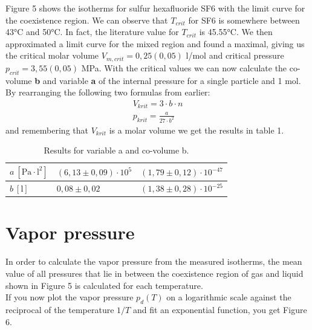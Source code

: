 \documentclass[10pt,a4paper]{article}
\begin{document}
Figure 5 shows the isotherms for sulfur hexafluoride SF6 with the limit curve for the coexistence region. We can observe that $T_{crit}$ for SF6 is somewhere between 43°C and 50°C. In fact, the literature value for $T_{crit}$ is 45.55°C.\cite{messerDataSheet}
We then approximated a limit curve for the mixed region and found a maximal, giving us the critical molar volume $V_{m,crit} = 0,25(0,05)$ l/mol and critical pressure $p_{crit} = 3,55(0,05)$ MPa.
With the critical values we can now calculate the co-volume \textbf {b} and variable \textbf{a} of the internal pressure for a single particle and 1 mol. By rearranging the following two formulas from earlier:
\begin{align*}
 V_{krit} = 3 \cdot b \cdot n \\
 p_{krit} = \frac{a}{27 \cdot b^2}
\end{align*}
and remembering that $V_{krit}$ is a molar volume we get the results in table 1.
\begin{table}[!ht]
\centering
\begin{tabular}{|l|l|l|}
\hline
 $a \ [\textrm{Pa} \cdot  \textrm{l}^2 ]$ & $(6,13 \pm 0,09) \cdot 10^{5}$  & $(1,79 \pm 0,12) \cdot 10^{-47}$ \\
 \hline
 $b \ [\textrm{l} ] $ &$ 0,08 \pm 0,02 $ & $(1,38 \pm 0,28) \cdot 10^{-25}$  \\ 
 \hline
\end{tabular}
\caption{Results for variable a and co-volume b.}
\end{table}
\section{Vapor pressure}
In order to calculate the vapor pressure from the measured isotherms, the mean value of all pressures that lie in between the coexistence region of gas and liquid shown in Figure 5 is calculated for each temperature. \\
If you now plot the vapor pressure $p_d(T)$ on a logarithmic scale against the reciprocal of the temperature $1/T$ and fit an exponential function, you get Figure 6.
\end{document}
